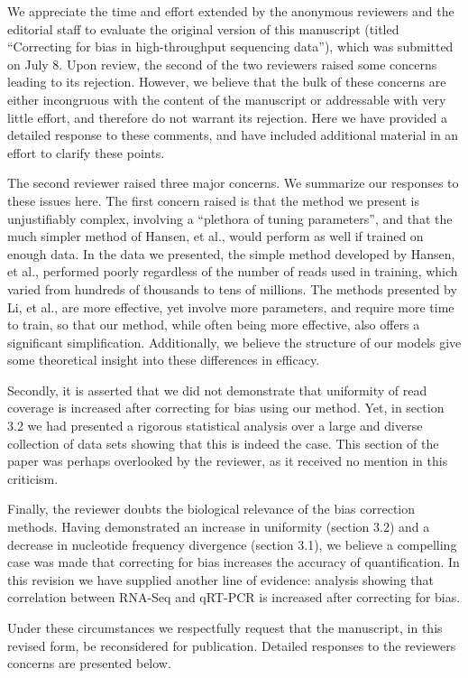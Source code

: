 \documentclass{article}
\begin{document}
We appreciate the time and effort extended by the anonymous reviewers and the
editorial staff to evaluate the original version of this manuscript (titled
``Correcting for bias in high-throughput sequencing data''), which was submitted
on July 8. Upon review, the second of the two reviewers raised some concerns
leading to its rejection. However, we believe that the bulk of these concerns
are either incongruous with the content of the manuscript or addressable with
very little effort, and therefore do not warrant its rejection.  Here we have
provided a detailed response to these comments, and have included additional
material in an effort to clarify these points.

The second reviewer raised three major concerns. We summarize our
responses to these issues here.  The first concern raised is
that the method we present is unjustifiably complex, involving a ``plethora of
tuning parameters'', and that the much simpler method of Hansen, et al., would
perform as well if trained on enough data.  In the data we presented, the simple
method developed by Hansen, et al., performed poorly regardless of the number of
reads used in training, which varied from hundreds of thousands to tens of
millions.  The methods presented by Li, et al., are more effective, yet involve
more parameters, and require more time to train, so that our method, while often
being more effective, also offers a significant simplification.
Additionally, we believe the structure of our models give some
theoretical insight into these differences in efficacy.

Secondly, it is asserted that we did not demonstrate that uniformity of read
coverage is increased after correcting for bias using our method.  Yet, in
section 3.2 we had presented a rigorous statistical analysis over a large and
diverse collection of data sets showing that this is indeed the case. This
section of the paper was perhaps overlooked by the reviewer, as it received
no mention in this criticism.

Finally, the reviewer doubts the biological relevance of the bias correction
methods. Having demonstrated an increase in uniformity (section 3.2) and a
decrease in nucleotide frequency divergence (section 3.1), we believe a
compelling case was made that correcting for bias increases the accuracy of
quantification. In this revision we have supplied another line of evidence:
analysis showing that correlation between RNA-Seq and qRT-PCR is increased after
correcting for bias.

Under these circumstances we respectfully request that the manuscript, in this
revised form, be reconsidered for publication. Detailed responses to the
reviewers concerns are presented below.
\end{document}
